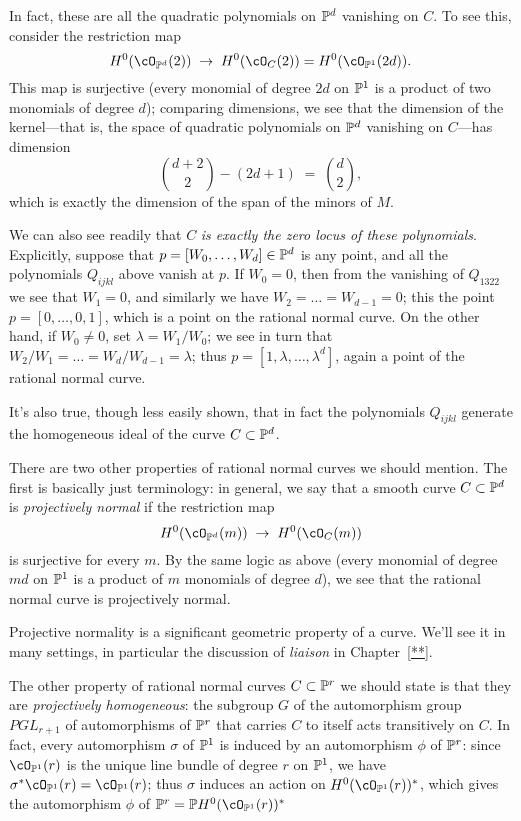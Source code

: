 In fact, these are all the quadratic polynomials on $\PP^d$ vanishing on $C$. To see this, consider the restriction map
$$
H^0(\cO_{\PP^d}(2)) \; \to \; H^0(\cO_{C}(2)) = H^0(\cO_{\PP^1}(2d)).
$$
This map is surjective (every monomial of degree $2d$ on $\PP^1$ is a product of two monomials of degree $d$); comparing dimensions, we see that the dimension of the kernel---that is, the space of quadratic polynomials on $\PP^d$ vanishing on $C$---has dimension
$$
\binom{d+2}{2} - (2d+1) \; = \; \binom{d}{2},
$$
which is exactly the dimension of the span of the minors of $M$. 

We can also see readily that $C$ \emph{is exactly the zero locus of these polynomials}. Explicitly, suppose that $p = [W_0,\dots,W_d] \in \PP^d$ is any point, and all the polynomials $Q_{ijkl}$ above vanish at $p$. If $W_0 = 0$, then from the vanishing of $Q_{1322}$ we see that $W_1 = 0$, and similarly we have $W_2 = \dots = W_{d-1}=0$; this the point $p = [0,\dots,0,1]$, which is a point on the rational normal curve. On the other hand, if $W_0 \neq 0$, set $\lambda = W_1/W_0$; we see in turn that $W_2/W_1 = \dots = W_d/W_{d-1} = \lambda$; thus $p = [1, \lambda, \dots,\lambda^d]$, again a point of the rational normal curve.

It's also true, though less easily shown, that in fact the polynomials $Q_{ijkl}$  generate the homogeneous ideal of the curve $C \subset \PP^d$.

There are two other properties of rational normal curves we should mention. The first is basically just terminology: in general, we say that a smooth curve $C \subset \PP^d$ is \emph{projectively normal} if the restriction map
$$
H^0(\cO_{\PP^d}(m)) \; \to \; H^0(\cO_{C}(m)) 
$$
is surjective for every $m$. By the same logic as above (every monomial of degree $md$ on $\PP^1$ is a product of $m$ monomials of degree $d$), we see that the rational normal curve is projectively normal. 

Projective normality is a significant geometric property of a curve. We'll see it in many settings, in particular the discussion of \emph{liaison} in Chapter~\ref{**}.

The other property of rational normal curves $C \subset \PP^r$ we should state is that they are \emph{projectively homogeneous}: the subgroup $G$ of the automorphism group $PGL_{r+1}$ of automorphisms of $\PP^r$ that carries $C$ to itself acts transitively on $C$. In fact, every automorphism $\sigma$ of $\PP^1$ is induced by an automorphism $\phi$ of $\PP^r$: since $\cO_{\PP^1}(r)$ is the unique line bundle of degree $r$ on $\PP^1$, we have $\sigma^*\cO_{\PP^1}(r) = \cO_{\PP^1}(r)$; thus $\sigma$ induces an action on $H^0(\cO_{\PP^1}(r))^*$, which gives the automorphism $\phi$ of $\PP^r = \PP H^0(\cO_{\PP^1}(r))^*$


